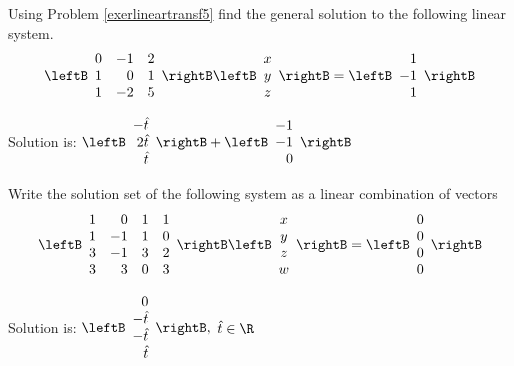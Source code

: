 \begin{enumialphparenastyle}
\begin{ex} Using Problem \ref{exerlineartransf5} find the general solution to the
following linear system.
\begin{equation*}
\leftB
\begin{array}{rrr}
0 & -1 & 2 \\
1 & 0 & 1 \\
1 & -2 & 5
\end{array}
\rightB \leftB
\begin{array}{c}
x \\
y \\
z
\end{array}
\rightB =\leftB
\begin{array}{r}
1 \\
-1 \\
1
\end{array}
\rightB 
\end{equation*}
\begin{sol}
Solution is: $\leftB
\begin{array}{r}
-\hat{t} \\
2\hat{t} \\
\hat{t}
\end{array}
\rightB +\leftB
\begin{array}{r}
-1 \\
-1 \\
0
\end{array}
\rightB $
\end{sol}
\end{ex}

\begin{ex} \label{exerlineartransf6}Write the solution set of the following system as a linear combination of vectors
\begin{equation*}
\leftB
\begin{array}{rrrr}
1 & 0 & 1 & 1 \\
1 & -1 & 1 & 0 \\
3 & -1 & 3 & 2 \\
3 & 3 & 0 & 3
\end{array}
\rightB \leftB
\begin{array}{c}
x \\
y \\
z \\
w
\end{array}
\rightB =\leftB
\begin{array}{r}
0 \\
0 \\
0 \\
0
\end{array}
\rightB 
\end{equation*}
\begin{sol}
Solution is: $\leftB
\begin{array}{r}
0 \\
-\hat{t} \\
-\hat{t} \\
\hat{t}
\end{array}
\rightB ,$ $\hat{t}\in \R$
\end{sol}
\end{ex}


\end{enumialphparenastyle}
